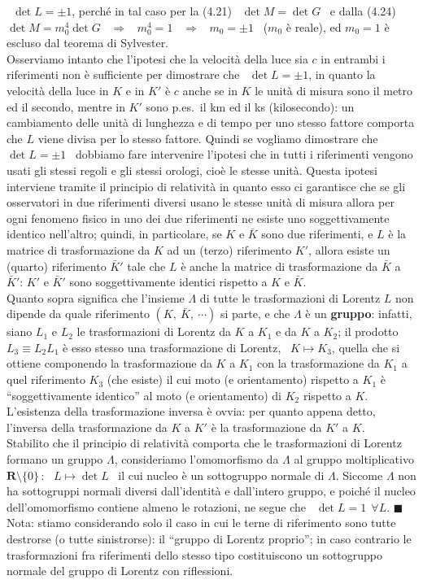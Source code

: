 \ $\det L=\pm1$, perch\'e in tal caso per la (4.21) \ $\det M=\det G$ \ e dalla
(4.24) \ $\det M=m_0^4\det G$ \ $\Rightarrow$ \ $m_0^4=1$ \ $\Rightarrow$
\ $m_0=\pm1$ \ ($m_0$ \`e reale), ed $m_0=1$ \`e escluso dal teorema di
Sylvester.\\
Osserviamo intanto che l'ipotesi che la velocit\`a della luce sia $c$ in
entrambi i riferimenti non \`e sufficiente per dimostrare che \ $\det L=\pm1$,
in quanto la velocit\`a della luce in $K$ e in $K'$ \`e $c$ anche se in $K$ le
unit\`a di misura sono il metro ed il secondo, mentre in $K'$ sono p.es.\ il km
ed il ks (kilosecondo): un cambiamento delle unit\`a di lunghezza e di tempo per
uno stesso fattore comporta che $L$ viene divisa per lo stesso fattore. Quindi
se vogliamo dimostrare che \ $\det L=\pm1$ \ dobbiamo fare intervenire l'ipotesi
che in tutti i riferimenti vengono usati gli stessi regoli e gli stessi orologi,
cio\`e le stesse unit\`a. Questa ipotesi interviene tramite il principio di
relativit\`a in quanto esso ci garantisce che se gli osservatori in due
riferimenti diversi usano le stesse unit\`a di misura allora per ogni fenomeno
fisico in uno dei due riferimenti ne esiste uno soggettivamente identico
nell'altro; quindi, in particolare, se $K$ e $\bar K$ sono due riferimenti, e
$L$ \`e la matrice di trasformazione da $K$ ad un (terzo) riferimento $K'$,
allora esiste un (quarto) riferimento $\bar K'$ tale che $L$ \`e anche la
matrice di trasformazione da $\bar K$ a $\bar K'$: $K'$ e $\bar K'$ sono
soggettivamente identici rispetto a $K$ e $\bar K$.\\
Quanto sopra significa che l'insieme $\Lambda$ di tutte le trasformazioni di
Lorentz $L$ non dipende da quale riferimento $(K,\ \bar K,\ \cdots)$ si parte, e
che $\Lambda$ \`e un \textbf{gruppo}: infatti, siano $L_1$ e $L_2$ le
trasformazioni di Lorentz da $K$ a $K_1$ e da $K$ a $K_2$; il prodotto
$L_3\equiv L_2L_1$ \`e esso stesso una trasformazione di Lorentz,
\ $K\mapsto K_3$, quella che si ottiene componendo la trasformazione da $K$ a
$K_1$ con la trasformazione da $K_1$ a quel riferimento $K_3$ (che esiste) il
cui moto (e orientamento) rispetto a $K_1$ \`e ``soggettivamente identico'' al
moto (e orientamento) di $K_2$ rispetto a $K$. L'esistenza della trasformazione
inversa \`e ovvia: per quanto appena detto, l'inversa della trasformazione da
$K$ a $K'$ \`e la trasformazione da $K'$ a $K$.\\
Stabilito che il principio di relativit\`a comporta che le trasformazioni di
Lorentz formano un gruppo $\Lambda$, consideriamo l'omomorfismo da $\Lambda$ al
gruppo moltiplicativo $\boldsymbol R\setminus\{0\}$\,: \ $L\mapsto\det L$ \ il
cui nucleo \`e un sottogruppo normale di $\Lambda$. Siccome $\Lambda$ non ha
sottogruppi normali diversi dall'identit\`a e dall'intero gruppo, e poich\'e il
nucleo dell'omomorfismo contiene almeno le rotazioni, ne segue che
\ $\det L=1\ \ \forall L$. $\blacksquare$\\
Nota: stiamo considerando solo il caso in cui le terne di riferimento sono tutte
destrorse (o tutte sinistrorse): il ``gruppo di Lorentz proprio''; in caso
contrario le trasformazioni
fra riferimenti dello stesso tipo costituiscono un sottogruppo normale del
gruppo di Lorentz con riflessioni.

